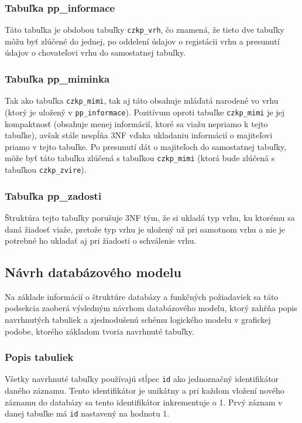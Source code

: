 \subsubsection*{Tabuľka pp\_informace}
Táto tabuľka je obdobou tabuľky \texttt{czkp_vrh}, čo znamená, že tieto dve tabuľky môžu byť zlúčené do jednej, po oddelení údajov o registácii vrhu a presunutí údajov o chovateľovi vrhu do samostatnej tabuľky.

\subsubsection*{Tabuľka pp\_miminka}
Tak ako tabuľka \texttt{czkp_mimi}, tak aj táto obsahuje mláďatá narodené vo vrhu (ktorý je uložený v \texttt{pp_informace}). Pozitívum oproti tabuľke \texttt{czkp_mimi} je jej kompaktnosť (obsahuje menej informácií, ktoré sa viažu nepriamo k tejto tabuľke), avšak stále nespĺňa 3NF vďaka ukladaniu informácií o majiteľovi priamo v tejto tabuľke. Po presunutí dát o majiteľoch do samostatnej tabuľky, môže byť táto tabuľka zlúčená s tabuľkou \texttt{czkp_mimi} (ktorá bude zlúčená s tabuľkou \texttt{czkp_zvire}).

\subsubsection*{Tabuľka pp\_zadosti}
Štruktúra tejto tabuľky porušuje 3NF tým, že si ukladá typ vrhu, ku ktorému sa daná žiadosť viaže, pretože typ vrhu je uložený 
už pri samotnom vrhu a nie je potrebné ho ukladať aj pri žiadosti o schválenie vrhu.

\subsection{Návrh databázového modelu}
Na základe informácií o štruktúre databázy a funkčných požiadaviek sa táto podsekcia zaoberá výsledným návrhom databázového modelu, ktorý zahŕňa popis navrhnutých tabuliek a zjednodušenú schému logického modelu v grafickej podobe, ktorého základom tvoria navrhnuté tabuľky.

\subsubsection{Popis tabuliek}
Všetky navrhnuté tabuľky používajú stĺpec \texttt{id} ako jednoznačný identifikátor daného záznamu.
Tento identifikátor je unikátny a pri každom vložení nového záznamu do databázy sa tento identifikátor inkrementuje o 1.
Prvý záznam v danej tabuľke má \texttt{id} nastavený na hodnotu 1.

